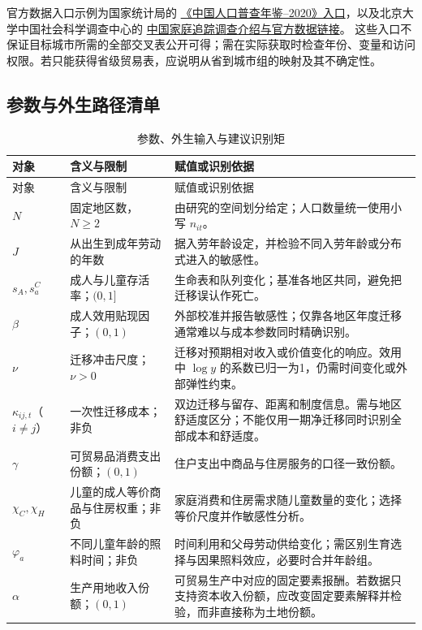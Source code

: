 \documentclass[UTF8,a4paper,zihao=-4,fontset=windows]{ctexart}
\numberwithin{equation}{section}
\begin{document}
\noindent 官方数据入口示例为国家统计局的
\href{https://www.stats.gov.cn/sj/pcsj/rkpc/7rp/zk/indexch.htm}{《中国人口普查年鉴--2020》入口}，以及北京大学中国社会科学调查中心的
\href{https://www.isss.pku.edu.cn/sjsj/cfpsxm/index.htm}{中国家庭追踪调查介绍与官方数据链接}。
这些入口不保证目标城市所需的全部交叉表公开可得；需在实际获取时检查年份、变量和访问权限。若只能获得省级贸易表，应说明从省到城市组的映射及其不确定性。

\subsection{参数与外生路径清单}
\small
\begin{longtable}{L{0.17\textwidth}L{0.35\textwidth}L{0.38\textwidth}}
\caption{参数、外生输入与建议识别矩}\label{tab:parameters}\\
\toprule
对象 & 含义与限制 & 赋值或识别依据\\
\midrule
\endfirsthead
\toprule
对象 & 含义与限制 & 赋值或识别依据\\
\midrule
\endhead
\bottomrule
\endfoot
$N$ & 固定地区数，$N\geq2$ & 由研究的空间划分给定；人口数量统一使用小写 $n_{it}$。\\
$J$ & 从出生到成年劳动的年数 & 据入劳年龄设定，并检验不同入劳年龄或分布式进入的敏感性。\\
$s_A,s^C_a$ & 成人与儿童存活率；$(0,1]$ & 生命表和队列变化；基准各地区共同，避免把迁移误认作死亡。\\
$\beta$ & 成人效用贴现因子；$(0,1)$ & 外部校准并报告敏感性；仅靠各地区年度迁移通常难以与成本参数同时精确识别。\\
$\nu$ & 迁移冲击尺度；$\nu>0$ & 迁移对预期相对收入或价值变化的响应。效用中 $\log y$ 的系数已归一为1，仍需时间变化或外部弹性约束。\\
$\kappa_{ij,t}$（$i\ne j$） & 一次性迁移成本；非负 & 双边迁移与留存、距离和制度信息。需与地区舒适度区分；不能仅用一期净迁移同时识别全部成本和舒适度。\\
$\gamma$ & 可贸易品消费支出份额；$(0,1)$ & 住户支出中商品与住房服务的口径一致份额。\\
$\chi_C,\chi_H$ & 儿童的成人等价商品与住房权重；非负 & 家庭消费和住房需求随儿童数量的变化；选择等价尺度并作敏感性分析。\\
$\varphi_a$ & 不同儿童年龄的照料时间；非负 & 时间利用和父母劳动供给变化；需区别生育选择与因果照料效应，必要时合并年龄组。\\
$\alpha$ & 生产用地收入份额；$(0,1)$ & 可贸易生产中对应的固定要素报酬。若数据只支持资本收入份额，应改变固定要素解释并检验，而非直接称为土地份额。\\

\end{longtable}
\end{document}
